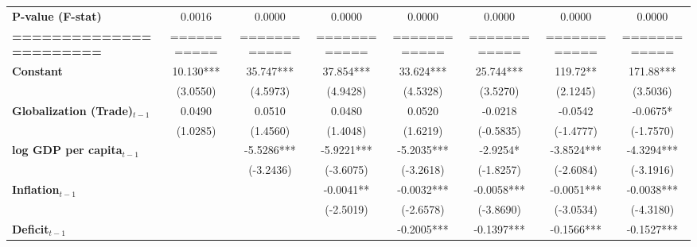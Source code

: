 \begin{center}
\begin{tabular}{lccccccc}
\textbf{P-value (F-stat)}          &       0.0016      &        0.0000        &           0.0000          &       0.0000       &      0.0000     &           0.0000          &            0.0000             \\
\textbf{=======================}   &    ===========    &     ============     &        ============       &    ============    &   ============  &        ============       &         ============          \\
\textbf{Constant}                     &     10.130***     &      35.747***       &         37.854***         &     33.624***      &    25.744***    &          119.72**         &          171.88***            \\
\textbf{ }                         &      (3.0550)     &       (4.5973)       &          (4.9428)         &      (4.5328)      &     (3.5270)    &          (2.1245)         &           (3.5036)            \\
\textbf{Globalization (Trade)$_{t-1}$}             &       0.0490      &        0.0510        &           0.0480          &       0.0520       &     -0.0218     &          -0.0542          &           -0.0675*            \\
\textbf{ }                         &      (1.0285)     &       (1.4560)       &          (1.4048)         &      (1.6219)      &    (-0.5835)    &         (-1.4777)         &          (-1.7570)            \\
\textbf{log GDP per capita$_{t-1}$}           &                   &      -5.5286***      &         -5.9221***        &     -5.2035***     &     -2.9254*    &         -3.8524***        &          -4.3294***           \\
\textbf{ }                         &                   &      (-3.2436)       &         (-3.6075)         &     (-3.2618)      &    (-1.8257)    &         (-2.6084)         &          (-3.1916)            \\
\textbf{Inflation$_{t-1}$}      &                   &                      &         -0.0041**         &     -0.0032***     &    -0.0058***   &         -0.0051***        &          -0.0038***           \\
\textbf{ }                         &                   &                      &         (-2.5019)         &     (-2.6578)      &    (-3.8690)    &         (-3.0534)         &          (-4.3180)            \\
\textbf{Deficit$_{t-1}$}             &                   &                      &                           &     -0.2005***     &    -0.1397***   &         -0.1566***        &          -0.1527***           \\

\end{tabular}
\end{center}
